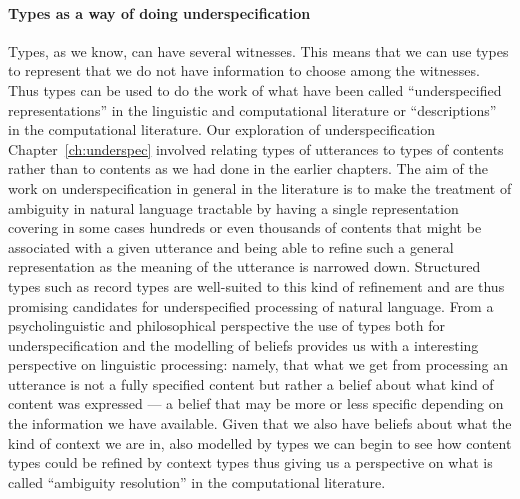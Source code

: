 \paragraph{Types as a way of doing underspecification}  Types, as we
know, can have several witnesses.  This means that we can use types to
represent that we do not have information to choose among the
witnesses.  Thus types can be used to do the work of what have been
called ``underspecified representations'' in the linguistic and
computational literature or ``descriptions'' in the computational
literature.  Our exploration of underspecification
Chapter~\ref{ch:underspec} involved relating types of utterances to
types of contents rather than to contents as we had done in the
earlier chapters.  The aim of the work on underspecification in
general in the literature is to make the treatment of ambiguity in
natural language tractable by having a single representation covering
in some cases hundreds or even thousands of contents that might be
associated with a given utterance and being able to refine such a
general representation as the meaning of the utterance is narrowed
down.  Structured types such as record types are well-suited to this
kind of refinement and are thus promising candidates for 
underspecified processing of natural language.  From a
psycholinguistic and philosophical perspective the use of types both
for underspecification and the modelling of beliefs provides us with a
interesting perspective on linguistic processing:  namely, that what
we get from processing an utterance is not a fully specified content
but rather a belief about what kind of content was expressed --- a
belief that may be more or less specific depending on the information
we have available.  Given that we also have beliefs about what the
kind of context we are in, also modelled by types we can begin to see
how content types could be refined by context types thus giving us a
perspective on what is called ``ambiguity resolution'' in the
computational literature.



